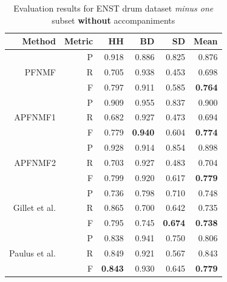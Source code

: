 \documentclass{article}
\begin{document}
\begin{table}[t]
\begin{footnotesize}
\centering
\begin{tabular*}{\textwidth}{@{\extracolsep{\stretch{1}}}*{6}{r}@{}}%
\hline
Method                         & Metric & HH             & BD             & SD             & Mean           \\ \hline
\multirow{3}{*}{PFNMF}         & P      & 0.918          & 0.886          & 0.825          & 0.876          \\
                               & R      & 0.705          & 0.938          & 0.453          & 0.698          \\
                               & F      & 0.797          & 0.911          & 0.585          & \textbf{0.764} \\ \hline
\multirow{3}{*}{APFNMF1}       & P      & 0.909          & 0.955          & 0.837          & 0.900          \\
                               & R      & 0.682          & 0.927          & 0.473          & 0.694          \\
                               & F      & 0.779          & \textbf{0.940} & 0.604          & \textbf{0.774} \\ \hline
\multirow{3}{*}{APFNMF2}       & P      & 0.928          & 0.914          & 0.854          & 0.898          \\
                               & R      & 0.703          & 0.927          & 0.483          & 0.704          \\
                               & F      & 0.799          & 0.920          & 0.617          & \textbf{0.779} \\ \hline
\multirow{3}{*}{Gillet et al.\cite{gillet_transcription_2008}} & P      & 0.736          & 0.798          & 0.710          & 0.748          \\
                               & R      & 0.865          & 0.700          & 0.642          & 0.735          \\
                               & F      & 0.795          & 0.745          & \textbf{0.674} & \textbf{0.738} \\ \hline
\multirow{3}{*}{Paulus et al.\cite{Paulus2009a}} & P      & 0.838          & 0.941          & 0.750          & 0.806          \\
                               & R      & 0.849          & 0.921          & 0.567          & 0.843          \\
                               & F      & \textbf{0.843} & 0.930          & 0.645          & \textbf{0.779} \\ \hline
\end{tabular*}
\end{footnotesize}
\caption{Evaluation results for ENST drum dataset \textit{minus one} subset \textbf{without} accompaniments}\label{results1}
\end{table}
\end{document}
